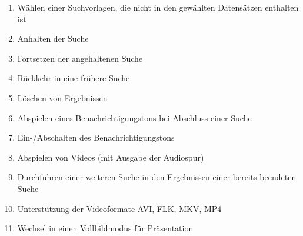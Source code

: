 \begin{enumerate} [label=\bfseries /F \arabic*0/]
	\subsection{Wunsch}
	\item Wählen einer Suchvorlagen, die nicht in den gewählten Datensätzen enthalten ist
	\newline
	\item Anhalten der Suche 	%
	\item Fortsetzen der angehaltenen Suche 	%
	\item Rückkehr in eine frühere Suche %
	\newline
	\item Löschen von Ergebnissen %
	\item Abspielen eines Benachrichtigungstons bei Abschluss einer Suche
	\item Ein-/Abschalten des Benachrichtigungstons
	\item Abspielen von Videos (mit Ausgabe der Audiospur)
	\item Durchführen einer weiteren Suche in den Ergebnissen einer bereits beendeten Suche
	\newline
	\item Unterstützung der Videoformate AVI, FLK, MKV, MP4
	\item Wechsel in einen Vollbildmodus für Präsentation
\end{enumerate}
